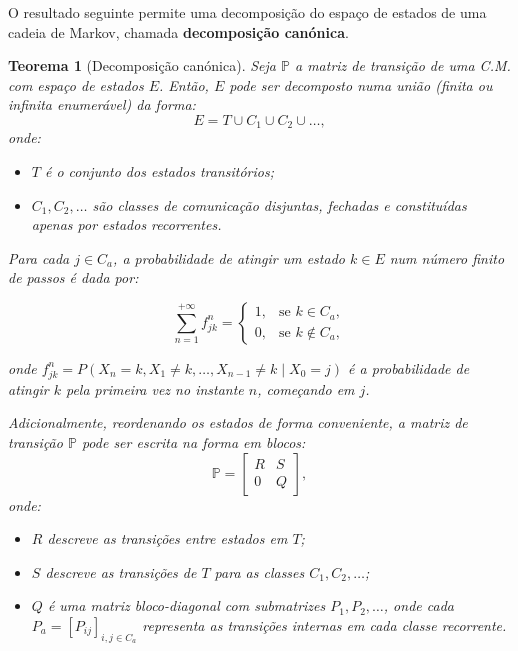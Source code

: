 \documentclass[
  11pt,
  a4paper,
]{book}
\newtheorem{theorem}{Teorema}[chapter]
\theoremstyle{definition}
\theoremstyle{definition}
\theoremstyle{definition}
\theoremstyle{definition}
\theoremstyle{remark}
\begin{document}
O resultado seguinte permite uma decomposição do espaço de estados de uma cadeia de Markov, chamada \textbf{decomposição canónica}.

\begin{theorem}[Decomposição canónica]

Seja \(\mathbb{P}\) a matriz de transição de uma C.M. com espaço de estados \(E\). Então, \(E\) pode ser decomposto numa união (finita ou infinita enumerável) da forma:
\[
E = T \cup C_1 \cup C_2 \cup \dots,
\]
onde:

\begin{itemize}
\item
  \(T\) é o conjunto dos estados transitórios;
\item
  \(C_1, C_2, \dots\) são classes de comunicação disjuntas, fechadas e constituídas apenas por estados recorrentes.
\end{itemize}

Para cada \(j \in C_a\), a probabilidade de atingir um estado \(k \in E\) num número finito de passos é dada por:

\[
\sum_{n=1}^{+\infty} f_{jk}^{n} =
\begin{cases}
1, & \text{se } k \in C_a, \\
0, & \text{se } k \notin C_a,
\end{cases}
\]

onde \(f_{jk}^{n} = P(X_n = k, X_1 \neq k, \dots, X_{n-1} \neq k \mid X_0 = j)\) é a probabilidade de atingir \(k\) pela primeira vez no instante \(n\), começando em \(j\).

Adicionalmente, reordenando os estados de forma conveniente, a matriz de transição \(\mathbb{P}\) pode ser escrita na forma em blocos:
\[
\mathbb{P} =
\begin{bmatrix}
R & S \\
0 & Q
\end{bmatrix},
\]
onde:

\begin{itemize}
\item
  \(R\) descreve as transições entre estados em \(T\);
\item
  \(S\) descreve as transições de \(T\) para as classes \(C_1, C_2, \dots\);
\item
  \(Q\) é uma matriz bloco-diagonal com submatrizes \(P_1, P_2, \dots\), onde cada \(P_a = [P_{ij}]_{i,j \in C_a}\) representa as transições internas em cada classe recorrente.
\end{itemize}

\end{theorem}
\end{document}
